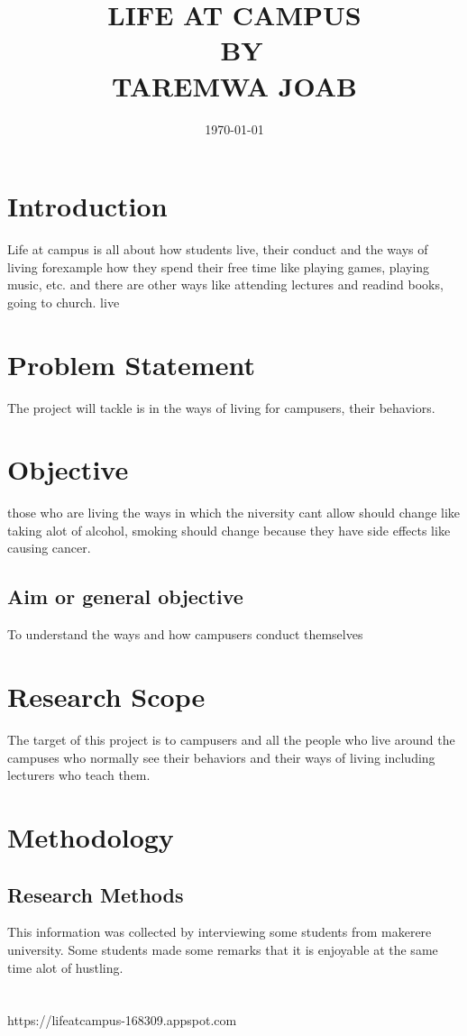 \documentclass[a4paper,12pt]{article}
\begin{document}
\title{LIFE AT CAMPUS\\\ BY\\\large TAREMWA JOAB}
\date{\today}


\maketitle
{}

\newpage
\section{Introduction}

Life at campus is all about how students live, their conduct and the ways of living forexample how they spend their free time like playing games, playing music, etc. and there are other ways like attending lectures and readind books, going to church. live

\section{ Problem Statement}
The project will tackle is in the ways of living for campusers, their behaviors.  

\section{	Objective}
those who are living the ways in which the niversity cant allow should change like taking alot of alcohol, smoking should change because they have side effects like causing cancer.
\subsection{Aim or general objective}
To understand the ways and how campusers conduct themselves 
\section{Research Scope}
The target of this project is to campusers and all the people who live around the campuses who normally see their behaviors and their ways of living  including lecturers who teach them.
	
\section{Methodology}
\subsection{Research Methods}
This information was collected by interviewing some students from makerere university. Some students made some remarks that it is enjoyable at the same time alot of hustling. 
\section{}{

}

\begin{thebibliography}{9}

  https://lifeatcampus-168309.appspot.com

\end{thebibliography}
\end{document}
